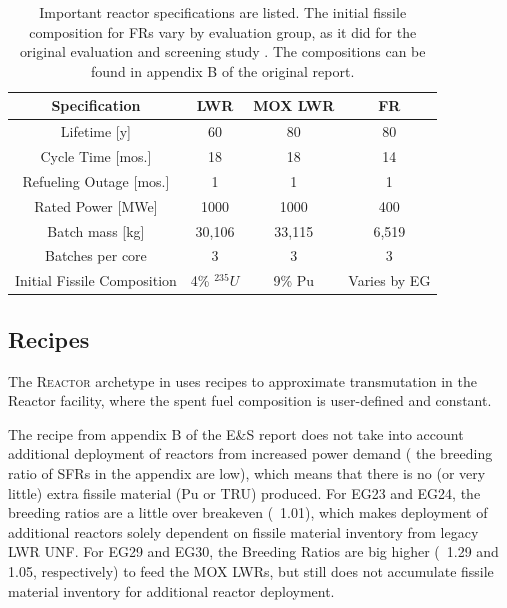 \begin{table}[h]
    \centering
    \begin{tabular}{cccc}
        \hline
        \textbf{Specification} & LWR & MOX LWR & FR\\
        \hline
                Lifetime [y] & 60 & 80 & 80 \\
                Cycle Time [mos.]& 18 & 18 & 14\\ 
                Refueling Outage [mos.]& 1 & 1  & 1\\
                Rated Power [MWe] & 1000 & 1000 & 400\\
                Batch mass [kg] & 30,106 & 33,115 & 6,519 \\
                Batches per core & 3 & 3 & 3\\
                Initial Fissile Composition & 4\% $^{235}U$ & 9\% Pu & Varies by EG \\
        \hline
    \end{tabular}
        \caption {Important reactor specifications are listed. The initial fissile composition
        		 for FRs vary by evaluation group, as it did for the original evaluation and screening
        		  study \cite{wigeland_nuclear_2014}. The compositions can be found in appendix B of the
        		  original report.}
    \label{tab:react}

    \end{table}

\subsection{Recipes}
The \textsc{Reactor}\xspace archetype in \Cycamore uses recipes to approximate
transmutation in the Reactor facility,
where the spent fuel composition is user-defined and constant. 

The recipe from appendix B of the E\&S report does not take into account
additional deployment of reactors from increased power demand ( the breeding ratio
of \glspl{SFR} in the appendix are low), which means that there is no (or very little)
extra fissile material (Pu or TRU) produced. For EG23 and EG24, the breeding ratios are
a little over breakeven (~1.01), which makes deployment of additional reactors solely 
dependent on fissile material inventory from legacy LWR \gls{UNF}. For EG29 and EG30,
the Breeding Ratios are big higher (~1.29 and 1.05, respectively) to feed the
\gls{MOX} \glspl{LWR}, but still does not accumulate fissile material inventory for
additional reactor deployment.


